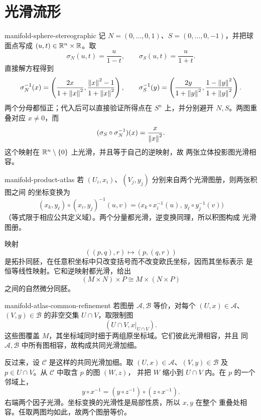 \chapter{光滑流形}

\begin{solution}{manifold-sphere-stereographic}
记 \(N=(0,\ldots,0,1)\)、\(S=(0,\ldots,0,-1)\)，并把球面点写成
\((u,t)\in\mathbb{R}^n\times\mathbb{R}\)。取
\[
 \sigma_N(u,t)=\frac{u}{1-t},\qquad
 \sigma_S(u,t)=\frac{u}{1+t}.
\]
直接解方程得到
\[
 \sigma_N^{-1}(x)=
 \left(\frac{2x}{1+\left\lVert x\right\rVert^2},
       \frac{\left\lVert x\right\rVert^2-1}{1+\left\lVert x\right\rVert^2}\right),
 \qquad
 \sigma_S^{-1}(y)=
 \left(\frac{2y}{1+\left\lVert y\right\rVert^2},
       \frac{1-\left\lVert y\right\rVert^2}{1+\left\lVert y\right\rVert^2}\right).
\]
两个分母都恒正；代入后可以直接验证所得点在 \(S^n\) 上，并分别避开
\(N,S\)。两图重叠对应 \(x\ne0\)，而
\[
 (\sigma_S\circ\sigma_N^{-1})(x)=\frac{x}{\left\lVert x\right\rVert^2}.
\]
这个映射在 \(\mathbb{R}^n\setminus\{0\}\) 上光滑，并且等于自己的逆映射，故
两张立体投影图光滑相容。
\end{solution}

\begin{solution}{manifold-product-atlas}
若 \((U_i,x_i)\)、\((V_j,y_j)\) 分别来自两个光滑图册，则两张积图之间
的坐标变换为
\[
 (x_k,y_\ell)\circ(x_i,y_j)^{-1}(u,v)
 =\bigl(x_k\circ x_i^{-1}(u),\,
        y_\ell\circ y_j^{-1}(v)\bigr)
\]
（等式限于相应公共定义域）。两个分量都光滑，逆变换同理，所以积图构成
光滑图册。

映射
\[
 ((p,q),r)\longmapsto(p,(q,r))
\]
是拓扑同胚，在任意积坐标中只改变括号而不改变欧氏坐标，因而其坐标表示
是恒等线性映射。它和逆映射都光滑，给出
\[
 (M\times N)\times P\cong M\times(N\times P)
\]
之间的自然微分同胚。
\end{solution}

\begin{solution}{manifold-atlas-common-refinement}
若图册 \(\mathcal A,\mathcal B\) 等价，对每个
\((U,x)\in\mathcal A\)、\((V,y)\in\mathcal B\) 的非空交集
\(U\cap V\)，取限制图
\[
 (U\cap V,x|_{U\cap V}).
\]
这些图覆盖 \(M\)，其坐标域同时细于两组原坐标域。它们彼此光滑相容，并且
同 \(\mathcal A,\mathcal B\) 中所有图相容，故构成共同光滑加细。

反过来，设 \(\mathcal C\) 是这样的共同光滑加细。取
\((U,x)\in\mathcal A\)、\((V,y)\in\mathcal B\) 及
\(p\in U\cap V\)。从 \(\mathcal C\) 中取含 \(p\) 的图 \((W,z)\)，
并把 \(W\) 缩小到 \(U\cap V\) 内。在 \(p\) 的一个邻域上，
\[
 y\circ x^{-1}
 =(y\circ z^{-1})\circ(z\circ x^{-1}).
\]
右端两个因子光滑。坐标变换的光滑性是局部性质，所以 \(x,y\) 在整个
重叠处相容。任取两图均如此，故两个图册等价。
\end{solution}

